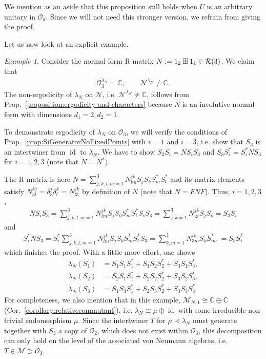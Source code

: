 \documentclass[12pt,a4paper]{amsart}
\numberwithin{equation}{section}
\theoremstyle{remark}
\newtheorem{example}[theorem]{Example}
\def\id{\operatorname{id}}
\def\id{\operatorname{id}}
\newcommand{\Cl}{\mathbb{C}}
\def\C{\mathbb{C}}
\newcommand{\la}{\lambda}
\newcommand{\CM}[0]{\mathcal{M}} \newcommand{\CN}[0]{\mathcal{N}}
\newcommand{\CO}[0]{\mathcal{O}} \newcommand{\CP}[0]{\mathcal{P}}
\begin{document}
We mention as an aside that this proposition still holds when $U$ is an arbitrary unitary in $\CO_d$. Since we will not need this stronger version, we refrain from giving the proof.

Let us now look at an explicit example.

\begin{example}
	Consider the normal form R-matrix $N:=1_2\boxplus1_1\in\mathcal{R}(3)$. We claim that
	\begin{align}\label{eq:ergodicity-mismatch}
	  \CO_3^{\la_N}=\Cl,\qquad \CN^{\la_N}\neq\Cl.
	\end{align}
	The non-ergodicity of $\la_N$ on $\CN$, i.e. $\CN^{\la_N}\neq\Cl$, follows from Prop.~\ref{proposition:ergodicity-and-characters} because $N$ is an involutive normal form with dimensions $d_1=2,d_2=1$. 
	
	To demonstrate ergodicity of $\la_N$ on $\CO_3$, we will verify the conditions of Prop.~\ref{prop:SiGeneratorNoFixedPoints} with $v=1$ and $i=3$, i.e. show that $S_3$ is an intertwiner from $\id$ to $\la_N$. We have to show $S_3S_i=NS_iS_3$ and $S_3S_i^*=S_i^*NS_3$ for $i=1,2,3$ (note that $N=N^*$).
	
	The R-matrix is here $N=\sum_{j,k,l,m=1}^3 N^{jk}_{lm}S_jS_kS_m^*S_l^*$ and its matrix elements satisfy $N^{kj}_{3l}=\delta^j_3\delta^k_l=N^{jk}_{l3}$ by definition of $N$ (note that $N=FNF$). Thus, $i=1,2,3$,
	\begin{align*}
	 NS_iS_3 
	 =
	 \sum_{j,k,l,m=1}^3 N^{jk}_{lm}S_jS_kS_m^*S_l^*S_iS_3 = 
	 \sum_{j,k=1}^3 N^{jk}_{i3}S_jS_k
	 = S_3S_i
	\end{align*}
	and
	\begin{align*}
	 S_i^*NS_3 
	 =
	 S_i^*\sum_{j,k,l,m=1}^3 N^{jk}_{lm}S_jS_kS_m^*S_l^*S_3
	 = 
	 \sum_{k,m=1}^3 N^{ik}_{3m}S_kS_m^*,
	 = S_3S_i^*
	\end{align*}
	which finishes the proof. With a little more effort, one shows
	\begin{align*}
	\lambda_N(S_1)&=S_1S_1S_1^*+S_1S_2S_2^*+S_3S_1S_3^*,\\
	\lambda_N(S_2)&=S_2S_1S_1^*+S_2S_2S_2^*+S_3S_2S_3^*,\\
	\lambda_N(S_3)&=S_1S_3S_1^*+S_2S_3S_2^*+S_3S_3S_3^*.
	\end{align*}
	For completeness, we also mention that in this example, $\CM_{N,1}\cong\C\oplus\C$ (Cor.~\ref{corollary:relativecommutant}), i.e. $\lambda_N\cong\mu\oplus\id$ with some irreducible non-trivial endomorphism $\mu$. Since the intertwiner $T$ for $\mu\prec\lambda_N$ must generate together with $S_3$ a copy of $\CO_2$, which does not exist within $\CO_3$, this decomposition can only hold on the level of the associated von Neumann algebras, i.e. $T\in\CM\supset\CO_3$.
\end{example}
\end{document}

